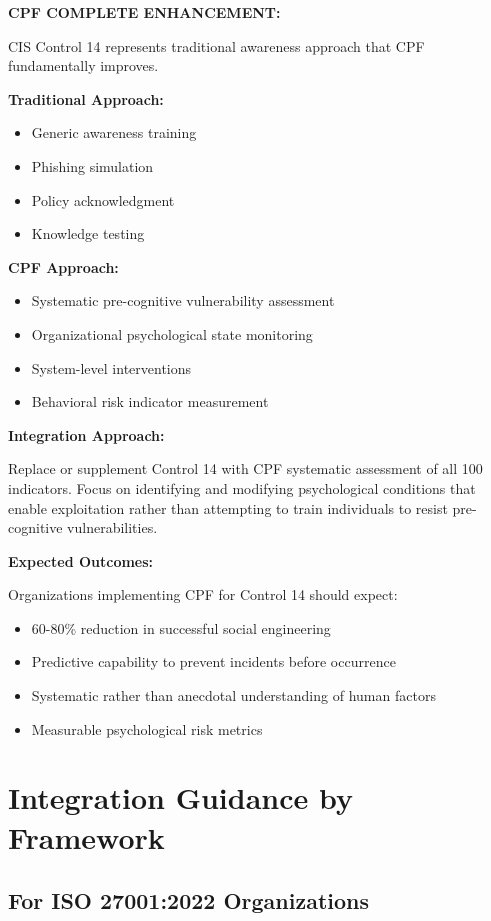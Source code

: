 \documentclass[11pt,a4paper]{article}
\begin{document}
\textbf{CPF COMPLETE ENHANCEMENT:}

CIS Control 14 represents traditional awareness approach that CPF fundamentally improves.

\textbf{Traditional Approach:}
\begin{itemize}
\item Generic awareness training
\item Phishing simulation
\item Policy acknowledgment
\item Knowledge testing
\end{itemize}

\textbf{CPF Approach:}
\begin{itemize}
\item Systematic pre-cognitive vulnerability assessment
\item Organizational psychological state monitoring
\item System-level interventions
\item Behavioral risk indicator measurement
\end{itemize}

\textbf{Integration Approach:}

Replace or supplement Control 14 with CPF systematic assessment of all 100 indicators. Focus on identifying and modifying psychological conditions that enable exploitation rather than attempting to train individuals to resist pre-cognitive vulnerabilities.

\textbf{Expected Outcomes:}

Organizations implementing CPF for Control 14 should expect:

\begin{itemize}
\item 60-80\% reduction in successful social engineering
\item Predictive capability to prevent incidents before occurrence
\item Systematic rather than anecdotal understanding of human factors
\item Measurable psychological risk metrics
\end{itemize}

\section{Integration Guidance by Framework}

\subsection{For ISO 27001:2022 Organizations}
\end{document}
